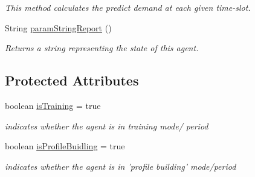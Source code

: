 \begin{DoxyCompactItemize}
\begin{DoxyCompactList}\small\item\em This method calculates the predict demand at each given time-\/slot. \end{DoxyCompactList}\item 
String \hyperlink{classuk_1_1ac_1_1dmu_1_1iesd_1_1cascade_1_1agents_1_1aggregators_1_1_supplier_co_neural_map_a65f3677239bfc35d0a0d7ee192d79c54}{param\-String\-Report} ()
\begin{DoxyCompactList}\small\item\em Returns a string representing the state of this agent. \end{DoxyCompactList}\end{DoxyCompactItemize}
\subsection*{Protected Attributes}
\begin{DoxyCompactItemize}
\item 
\hypertarget{classuk_1_1ac_1_1dmu_1_1iesd_1_1cascade_1_1agents_1_1aggregators_1_1_supplier_co_neural_map_aa89abf4305e19f3140c65249dff793f7}{boolean \hyperlink{classuk_1_1ac_1_1dmu_1_1iesd_1_1cascade_1_1agents_1_1aggregators_1_1_supplier_co_neural_map_aa89abf4305e19f3140c65249dff793f7}{is\-Training} = true}\label{classuk_1_1ac_1_1dmu_1_1iesd_1_1cascade_1_1agents_1_1aggregators_1_1_supplier_co_neural_map_aa89abf4305e19f3140c65249dff793f7}

\begin{DoxyCompactList}\small\item\em indicates whether the agent is in training mode/ period \end{DoxyCompactList}\item 
\hypertarget{classuk_1_1ac_1_1dmu_1_1iesd_1_1cascade_1_1agents_1_1aggregators_1_1_supplier_co_neural_map_a9616b661079591916dba42ba10d3be04}{boolean \hyperlink{classuk_1_1ac_1_1dmu_1_1iesd_1_1cascade_1_1agents_1_1aggregators_1_1_supplier_co_neural_map_a9616b661079591916dba42ba10d3be04}{is\-Profile\-Buidling} = true}\label{classuk_1_1ac_1_1dmu_1_1iesd_1_1cascade_1_1agents_1_1aggregators_1_1_supplier_co_neural_map_a9616b661079591916dba42ba10d3be04}

\begin{DoxyCompactList}\small\item\em indicates whether the agent is in 'profile building' mode/period \end{DoxyCompactList}\end{DoxyCompactItemize}
